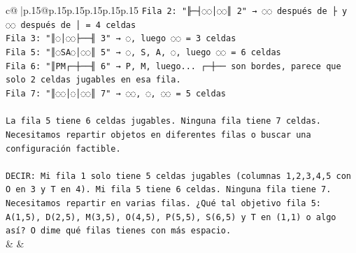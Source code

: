 \documentclass{article}
\begin{document}
{\begin{supertabular}{c@{$\;$}|p{.15\linewidth}@{}p{.15\linewidth}p{.15\linewidth}p{.15\linewidth}p{.15\linewidth}p{.15\linewidth}}
{{{\texttt{Fila 2: "╟─┤◌◌│◌◌║ 2" → ◌◌ después de ├ y ◌◌ después de │ = 4 celdas} \\
\texttt{Fila 3: "║◌│◌◌├──╢ 3" → ◌, luego ◌◌ = 3 celdas} \\
\texttt{Fila 5: "║◌SA◌│◌◌║ 5" → ◌, S, A, ◌, luego ◌◌ = 6 celdas} \\
\texttt{Fila 6: "║PM┌─┼──╢ 6" → P, M, luego... ┌─┼── son bordes, parece que solo 2 celdas jugables en esa fila.} \\
\texttt{Fila 7: "║◌◌│◌│◌◌║ 7" → ◌◌, ◌, ◌◌ = 5 celdas} \\
\\ 
\texttt{La fila 5 tiene 6 celdas jugables. Ninguna fila tiene 7 celdas. Necesitamos repartir objetos en diferentes filas o buscar una configuración factible.} \\
\\ 
\texttt{DECIR: Mi fila 1 solo tiene 5 celdas jugables (columnas 1,2,3,4,5 con O en 3 y T en 4). Mi fila 5 tiene 6 celdas. Ninguna fila tiene 7. Necesitamos repartir en varias filas. ¿Qué tal objetivo fila 5: A(1,5), D(2,5), M(3,5), O(4,5), P(5,5), S(6,5) y T en (1,1) o algo así? O dime qué filas tienes con más espacio.} \\
            }
        }
    }
    & & \\ \\


\end{supertabular}}
\end{document}
